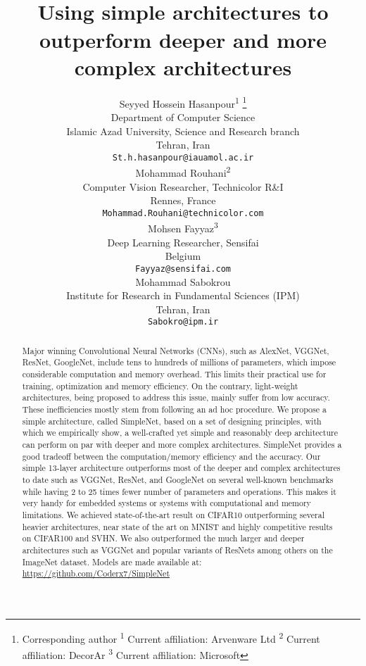 \documentclass{article} \usepackage{lets_keepit_simple,times}
\title{\center{Let's keep it simple,}\\
 Using simple architectures to outperform deeper and more complex architectures 
}
\author{Seyyed Hossein Hasanpour\textsuperscript{1} \thanks{Corresponding author \newline \textsuperscript{1} Current affiliation: Arvenware Ltd \newline \textsuperscript{2} Current affiliation: DecorAr \newline \textsuperscript{3} Current affiliation: Microsoft} \\
Department of Computer Science\\
Islamic Azad University, Science and Research branch\\
Tehran, Iran\\
\texttt{St.h.hasanpour@iauamol.ac.ir} \\
\And
Mohammad Rouhani\textsuperscript{2} \\
Computer Vision Researcher, Technicolor R\&I\\
Rennes, France\\
\texttt{Mohammad.Rouhani@technicolor.com} \\
\And
Mohsen Fayyaz\textsuperscript{3} \\
Deep Learning Researcher, Sensifai \hspace{1cm}\hspace{1cm}\hspace{1cm}\\
Belgium\\
\texttt{Fayyaz@sensifai.com} \\
\And
Mohammad Sabokrou \\
Institute for Research in Fundamental Sciences (IPM)\\
Tehran, Iran\\
\texttt{Sabokro@ipm.ir}
}
\begin{document}
\maketitle

\begin{abstract}
Major winning Convolutional Neural Networks (CNNs), such as AlexNet, VGGNet, ResNet, GoogleNet, include tens to hundreds of millions of parameters, which impose considerable computation and memory overhead. This limits their practical use for training, optimization and memory efficiency. On the contrary, light-weight architectures, being proposed to address this issue, mainly suffer from low accuracy. These inefficiencies mostly stem from following an ad hoc procedure. We propose a simple architecture, called SimpleNet, based on a set of designing principles, with which we empirically show, a well-crafted yet simple and reasonably deep architecture can perform on par with deeper and more complex architectures. SimpleNet provides a good tradeoff between the computation/memory efficiency and the accuracy. Our simple 13-layer architecture outperforms most of the deeper and complex architectures to date such as VGGNet, ResNet, and GoogleNet on several well-known benchmarks while having 2 to 25 times fewer number of parameters and operations. This makes it very handy for embedded systems or systems with computational and memory limitations. We achieved state-of-the-art result on CIFAR10 outperforming several heavier architectures, near state of the art on MNIST and highly competitive results on CIFAR100 and SVHN. We also outperformed the much larger and deeper architectures such as VGGNet and popular variants of ResNets among others on the ImageNet dataset. Models are made available at: \href{url}{https://github.com/Coderx7/SimpleNet} 
\end{abstract}
\end{document}
